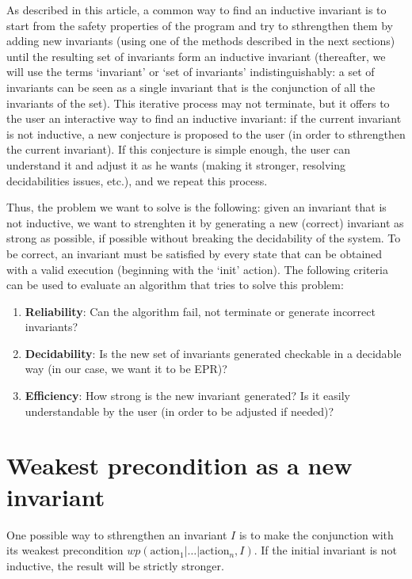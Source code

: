 \documentclass[11pt,a4paper,oldfontcommands,openany]{memoir}
\begin{document}
    As described in this article\cite{Karbyshev:2017:PIU:3065931.3022187}, a common way to find an inductive invariant is to start from the safety properties of the program
    and try to sthrengthen them by adding new invariants (using one of the methods described in the next sections) until the resulting set of invariants form an inductive invariant
    (thereafter, we will use the terms `invariant' or `set of invariants' indistinguishably: a set of invariants can be seen as a single invariant that is the conjunction of all the invariants of the set).
    This iterative process may not terminate, but it offers to the user an interactive way to find an inductive invariant:
    if the current invariant is not inductive, a new conjecture is proposed to the user (in order to sthrengthen the current invariant).
    If this conjecture is simple enough, the user can understand it and adjust it as he wants (making it stronger, resolving decidabilities issues, etc.), and we repeat this process.

    Thus, the problem we want to solve is the following:
    given an invariant that is not inductive, we want to strenghten it by generating a new (correct) invariant as strong as possible, if possible without breaking the decidability of the system.
    To be correct, an invariant must be satisfied by every state that can be obtained with a valid execution (beginning with the `init' action).
    The following criteria can be used to evaluate an algorithm that tries to solve this problem:
    \begin{enumerate}
        \item \textbf{Reliability}: Can the algorithm fail, not terminate or generate incorrect invariants?
        \item \textbf{Decidability}: Is the new set of invariants generated checkable in a decidable way (in our case, we want it to be EPR)?
        \item \textbf{Efficiency}: How strong is the new invariant generated? Is it easily understandable by the user (in order to be adjusted if needed)?
    \end{enumerate}

    \section{Weakest precondition as a new invariant}

    One possible way to sthrengthen an invariant \(I\) is to make the conjunction with its weakest precondition \(wp(\text{action}_1|\ldots|\text{action}_n,I)\).
    If the initial invariant is not inductive, the result will be strictly stronger.
\end{document}
